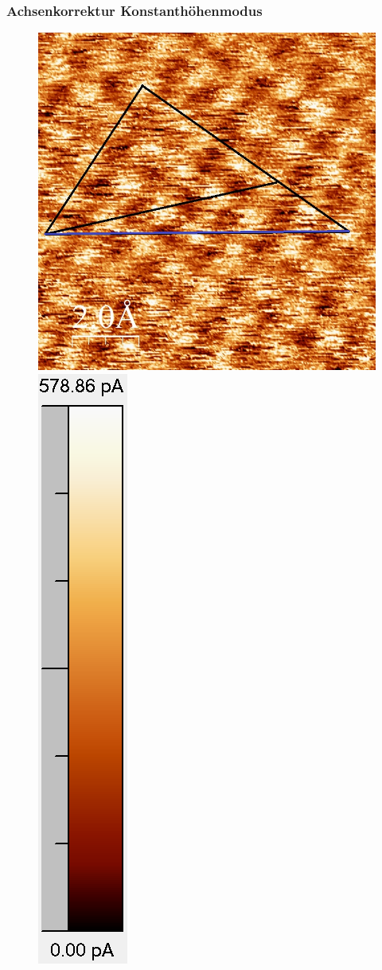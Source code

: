 \documentclass[12pt,a4paper]{article}
\begin{document}
\subsubsection{Achsenkorrektur Konstanthöhenmodus}
\begin{figure}[H]
\centering
\includegraphics[scale=0.36]{Bilder/Atome/hoch1_h.jpg}
\includegraphics[scale=0.49]{Bilder/Atome/hoch1_scale.png}

\end{figure}
\end{document}
